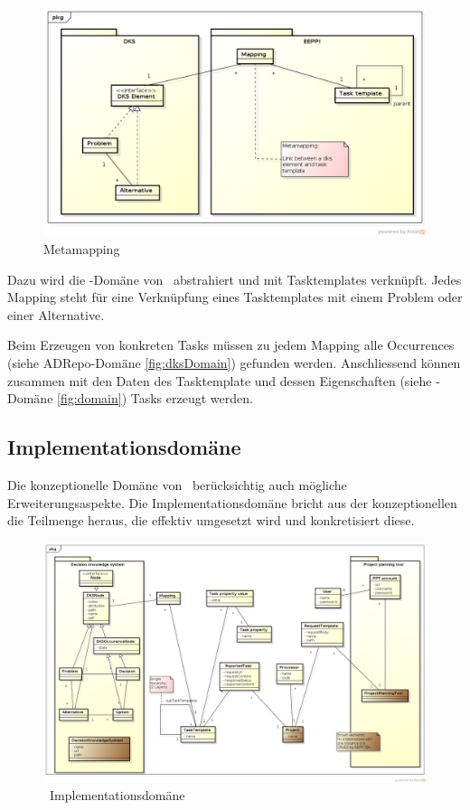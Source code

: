 			\begin{figure}[H]
				\includegraphics[width=\linewidth]{architecture/media/img/metaMapping.png}
				\centering
				\caption{Metamapping}
				\label{fig:metamapping}
			\end{figure}		
			
			Dazu wird die \dks -Domäne von \eeppi\ abstrahiert und mit Task\-tem\-plates verknüpft.
			Jedes Mapping steht für eine Verknüpfung eines Tasktemplates mit einem Problem oder einer Alternative.
			
			Beim Erzeugen von konkreten Tasks müssen zu jedem Mapping alle Occurrences (siehe ADRepo-Domäne \ref{fig:dksDomain}) gefunden werden. %
			Anschliessend können zusammen mit den Daten des Tasktemplate und dessen Eigenschaften (siehe \eeppi-Domäne \ref{fig:domain}) Tasks erzeugt werden.
			
			
		\subsection{Implementationsdomäne}
			Die konzeptionelle Domäne von \eeppi\ berücksichtig auch mögliche Erweiterungsaspekte.
			Die Implementationsdomäne bricht aus der konzeptionellen die Teilmenge heraus, die effektiv umgesetzt wird und konkretisiert diese.
			
			\begin{landscape}
				\begin{figure}[H]
					\includegraphics[width=0.9\linewidth]{architecture/media/img/implementationDomain.png}
					\centering
					\caption{\eeppi\ Implementationsdomäne}
					\label{fig:implementationDomain}
				\end{figure}				
			\end{landscape}	
			
